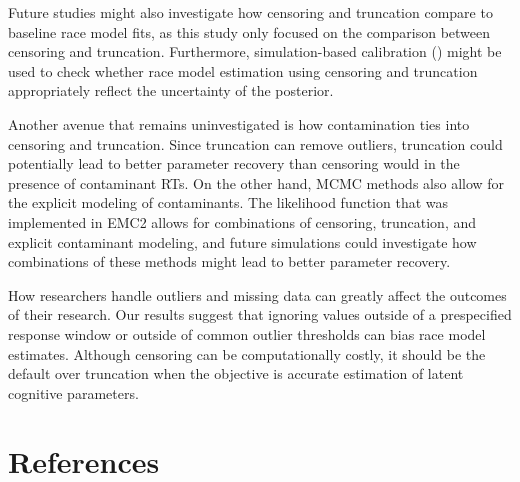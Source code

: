 \documentclass[
  stu,
  longtable,
  nolmodern,
  notxfonts,
  notimes,
  draftfirst,
  colorlinks=true,linkcolor=blue,citecolor=blue,urlcolor=blue]{apa7}
\begin{document}
Future studies might also investigate how censoring and truncation
compare to baseline race model fits, as this study only focused on the
comparison between censoring and truncation. Furthermore,
simulation-based calibration ()
might be used to check whether race model estimation using censoring and
truncation appropriately reflect the uncertainty of the posterior.

Another avenue that remains uninvestigated is how contamination ties
into censoring and truncation. Since truncation can remove outliers,
truncation could potentially lead to better parameter recovery than
censoring would in the presence of contaminant RTs. On the other hand,
MCMC methods also allow for the explicit modeling of contaminants. The
likelihood function that was implemented in EMC2 allows for combinations
of censoring, truncation, and explicit contaminant modeling, and future
simulations could investigate how combinations of these methods might
lead to better parameter recovery.

How researchers handle outliers and missing data can greatly affect the
outcomes of their research. Our results suggest that ignoring values
outside of a prespecified response window or outside of common outlier
thresholds can bias race model estimates. Although censoring can be
computationally costly, it should be the default over truncation when
the objective is accurate estimation of latent cognitive parameters.

\newpage{}

\section{References}\label{references}
\end{document}
